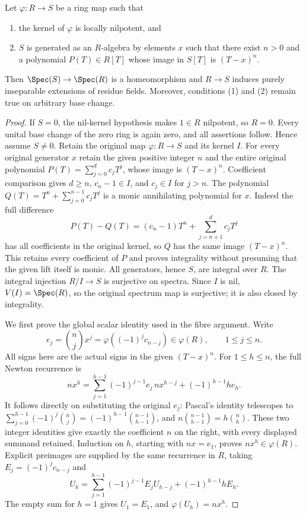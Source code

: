 \begin{lemma}
\label{editorial-source-lemma-universally-bijective}
Let $\varphi : R \to S$ be a ring map such that
\begin{enumerate}
\item the kernel of $\varphi$ is locally nilpotent, and
\item $S$ is generated as an $R$-algebra by elements $x$
such that there exist $n > 0$ and a polynomial $P(T) \in R[T]$
whose image in $S[T]$ is $(T - x)^n$.
\end{enumerate}
Then $\Spec(S) \to \Spec(R)$ is a homeomorphism and $R \to S$
induces purely inseparable extensions of residue fields.
Moreover, conditions (1) and (2) remain true on arbitrary base change.
\end{lemma}

\begin{proof}
If $S=0$, the nil-kernel hypothesis
makes $1\in R$ nilpotent, so $R=0$.
Every unital base change of the zero
ring is again zero, and all assertions
follow. Hence assume $S\neq0$.
Retain the original map $\varphi:R\to S$
and its kernel $I$. For every original
generator $x$ retain the given positive
integer $n$ and the entire original
polynomial $P(T)=\sum_{j=0}^d c_jT^j$,
whose image is $(T-x)^n$. Coefficient
comparison gives $d\geq n$,
$c_n-1\in I$, and $c_j\in I$ for
$j>n$. The polynomial
$Q(T)=T^n+\sum_{j=0}^{n-1}c_jT^j$
is a monic annihilating polynomial
for $x$. Indeed the full difference
$$
P(T)-Q(T)=(c_n-1)T^n+
\sum_{j=n+1}^d c_jT^j
$$
has all coefficients in the original
kernel, so $Q$ has the same image
$(T-x)^n$. This retains every
coefficient of $P$ and proves
integrality without presuming that
the given lift itself is monic.
All generators, hence $S$, are
integral over $R$. The integral
injection $R/I\to S$ is surjective
on spectra. Since $I$ is nil,
$V(I)=\Spec(R)$, so the original
spectrum map is surjective; it is
also closed by integrality.

We first prove the global scalar
identity used in the fibre argument.
Write
$$
e_j=\binom nj x^j
=\varphi((-1)^j c_{n-j})\in\varphi(R),
\qquad 1\leq j\leq n.
$$
All signs here are the actual signs
in the given $(T-x)^n$. For
$1\leq h\leq n$, the full Newton
recurrence is
$$
n x^h=
\sum_{j=1}^{h-1}(-1)^{j-1}e_j\,n x^{h-j}
+(-1)^{h-1}h e_h.
$$
It follows directly on substituting
the original $e_j$: Pascal's identity
telescopes to
$\sum_{j=0}^{h-1}(-1)^j\binom nj
=(-1)^{h-1}\binom{n-1}{h-1}$,
and $n\binom{n-1}{h-1}=h\binom nh$.
These two integer identities give
exactly the coefficient $n$ on the
right, with every displayed summand
retained. Induction on $h$, starting
with $n x=e_1$, proves $n x^h\in\varphi(R)$.
Explicit preimages are supplied by
the same recurrence in $R$, taking
$E_j=(-1)^j c_{n-j}$ and
$$
U_h=\sum_{j=1}^{h-1}(-1)^{j-1}E_j U_{h-j}
+(-1)^{h-1}h E_h.
$$
The empty sum for $h=1$ gives
$U_1=E_1$, and $\varphi(U_h)=n x^h$.


\end{proof}
